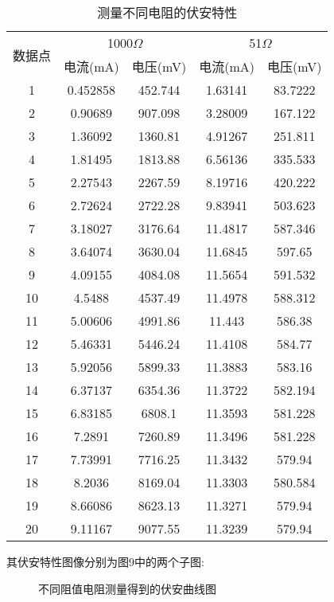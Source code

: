 \documentclass[11pt]{article}
\begin{document}
\begin{enumerate}
    
      \begin{table}[!ht]
        \centering
        \caption{测量不同电阻的伏安特性}
        \begin{tabular}{ccccc}
        \toprule
        \multirow{2}{*}{数据点} & \multicolumn{2}{c}{1000$\Omega$}&  \multicolumn{2}{c}{51$\Omega$}\\
        \cmidrule{2-3}\cmidrule{4-5}
               & 电流(mA) & 电压(mV) & 电流(mA) & 电压(mV) \\ \hline
        1 & 0.452858 & 452.744 & 1.63141 & 83.7222 \\ 
        2 & 0.90689 & 907.098 & 3.28009 & 167.122 \\ 
        3 & 1.36092 & 1360.81 & 4.91267 & 251.811 \\ 
        4 & 1.81495 & 1813.88 & 6.56136 & 335.533 \\ 
        5 & 2.27543 & 2267.59 & 8.19716 & 420.222 \\ 
        6 & 2.72624 & 2722.28 & 9.83941 & 503.623 \\ 
        7 & 3.18027 & 3176.64 & 11.4817 & 587.346 \\ 
        8 & 3.64074 & 3630.04 & 11.6845 & 597.65 \\ 
        9 & 4.09155 & 4084.08 & 11.5654 & 591.532 \\ 
        10 & 4.5488 & 4537.49 & 11.4978 & 588.312 \\ 
        11 & 5.00606 & 4991.86 & 11.443 & 586.38 \\ 
        12 & 5.46331 & 5446.24 & 11.4108 & 584.77 \\ 
        13 & 5.92056 & 5899.33 & 11.3883 & 583.16 \\ 
        14 & 6.37137 & 6354.36 & 11.3722 & 582.194 \\ 
        15 & 6.83185 & 6808.1 & 11.3593 & 581.228 \\ 
        16 & 7.2891 & 7260.89 & 11.3496 & 581.228 \\ 
        17 & 7.73991 & 7716.25 & 11.3432 & 579.94 \\ 
        18 & 8.2036 & 8169.04 & 11.3303 & 580.584 \\ 
        19 & 8.66086 & 8623.13 & 11.3271 & 579.94 \\ 
        20 & 9.11167 & 9077.55 & 11.3239 & 579.94 \\
            \bottomrule
        \end{tabular}
    \end{table}

其伏安特性图像分别为图9中的两个子图:
    \begin{figure}[H]
        \centering
        \hspace{0.5cm}
        \caption{不同阻值电阻测量得到的伏安曲线图}
    \end{figure}
    

\end{enumerate}
\end{document}
